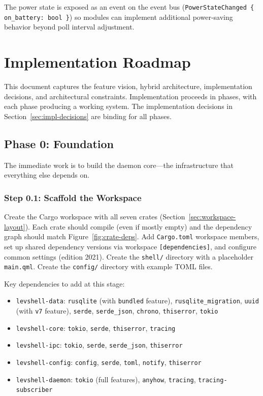 \documentclass[11pt,a4paper]{article}
\begin{document}
The power state is exposed as an event on the event bus (\texttt{PowerStateChanged \{ on\_battery: bool \}}) so modules can implement additional power-saving behavior beyond poll interval adjustment.


\section{Implementation Roadmap}
\label{sec:next-steps}

This document captures the feature vision, hybrid architecture, implementation decisions, and architectural constraints. Implementation proceeds in phases, with each phase producing a working system. The implementation decisions in Section~\ref{sec:impl-decisions} are binding for all phases.

\subsection{Phase 0: Foundation}

The immediate work is to build the daemon core---the infrastructure that everything else depends on.

\subsubsection{Step 0.1: Scaffold the Workspace}

Create the Cargo workspace with all seven crates (Section~\ref{sec:workspace-layout}). Each crate should compile (even if mostly empty) and the dependency graph should match Figure~\ref{fig:crate-deps}. Add \texttt{Cargo.toml} workspace members, set up shared dependency versions via workspace \texttt{[dependencies]}, and configure common settings (edition 2021). Create the \texttt{shell/} directory with a placeholder \texttt{main.qml}. Create the \texttt{config/} directory with example TOML files.

Key dependencies to add at this stage:
\begin{itemize}[leftmargin=1.5em, itemsep=1pt]
  \item \texttt{levshell-data}: \texttt{rusqlite} (with \texttt{bundled} feature), \texttt{rusqlite\_migration}, \texttt{uuid} (with \texttt{v7} feature), \texttt{serde}, \texttt{serde\_json}, \texttt{chrono}, \texttt{thiserror}, \texttt{tokio}
  \item \texttt{levshell-core}: \texttt{tokio}, \texttt{serde}, \texttt{thiserror}, \texttt{tracing}
  \item \texttt{levshell-ipc}: \texttt{tokio}, \texttt{serde}, \texttt{serde\_json}, \texttt{thiserror}
  \item \texttt{levshell-config}: \texttt{config}, \texttt{serde}, \texttt{toml}, \texttt{notify}, \texttt{thiserror}
  \item \texttt{levshell-daemon}: \texttt{tokio} (full features), \texttt{anyhow}, \texttt{tracing}, \texttt{tracing-subscriber}
\end{itemize}
\end{document}
